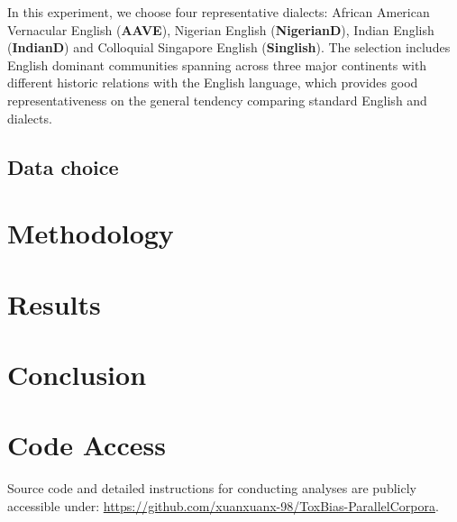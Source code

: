 \documentclass[11pt]{article}
\begin{document}
In this experiment, we choose four representative dialects: African American Vernacular English (\textbf{AAVE}), Nigerian English (\textbf{NigerianD}), Indian English (\textbf{IndianD}) and Colloquial Singapore English (\textbf{Singlish}). The selection includes English dominant communities spanning across three major continents with different historic relations with the English language, which provides good representativeness on the general tendency comparing standard English and dialects.












































\newpage


\subsection{Data choice}

\section{Methodology}

\section{Results}

\section{Conclusion}




\newpage









\appendix

\section{Code Access}

Source code and detailed instructions for conducting analyses are publicly accessible under: \href{https://github.com/xuanxuanx-98/ToxBias-ParallelCorpora}{https://github.com/xuanxuanx-98/ToxBias-ParallelCorpora}.
\end{document}
